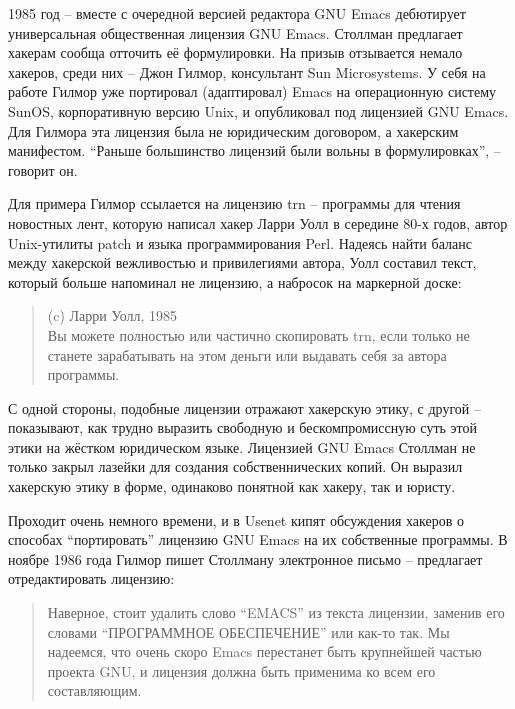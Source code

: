1985 год -- вместе с очередной версией редактора GNU Emacs дебютирует универсальная общественная лицензия GNU Emacs. Столлман предлагает хакерам сообща отточить её формулировки. На призыв отзывается немало хакеров, среди них -- Джон Гилмор, консультант Sun Microsystems. У себя на работе Гилмор уже портировал (адаптировал) Emacs на операционную систему SunOS, корпоративную версию Unix, и опубликовал под лицензией GNU Emacs. Для Гилмора эта лицензия была не юридическим договором, а хакерским манифестом. \enquote{Раньше большинство лицензий были вольны в формулировках}, -- говорит он.

Для примера Гилмор ссылается на лицензию trn -- программы для чтения новостных лент, которую написал хакер Ларри Уолл в середине 80-х годов, автор Unix-утилиты patch и языка программирования Perl. Надеясь найти баланс между хакерской вежливостью и привилегиями автора, Уолл составил текст, который больше напоминал не лицензию, а набросок на маркерной доске:

\begin{quote}
(c) Ларри Уолл, 1985\\
Вы можете полностью или частично скопировать trn, если только не станете зарабатывать на этом деньги или выдавать себя за автора программы.
\end{quote}

С одной стороны, подобные лицензии отражают хакерскую этику, с другой -- показывают, как трудно выразить свободную и бескомпромиссную суть этой этики на жёстком юридическом языке. Лицензией GNU Emacs Столлман не только закрыл лазейки для создания собственнических копий. Он выразил хакерскую этику в форме, одинаково понятной как хакеру, так и юристу.

Проходит очень немного времени, и в Usenet кипят обсуждения хакеров о способах \enquote{портировать} лицензию GNU Emacs на их собственные программы. В ноябре 1986 года Гилмор пишет Столлману электронное письмо -- предлагает отредактировать лицензию:

\begin{quote}
Наверное, стоит удалить слово \enquote{EMACS} из текста лицензии, заменив его словами \enquote{ПРОГРАММНОЕ ОБЕСПЕЧЕНИЕ} или как-то так. Мы надеемся, что очень скоро Emacs перестанет быть крупнейшей частью проекта GNU, и лицензия должна быть применима ко всем его составляющим.
\end{quote}

